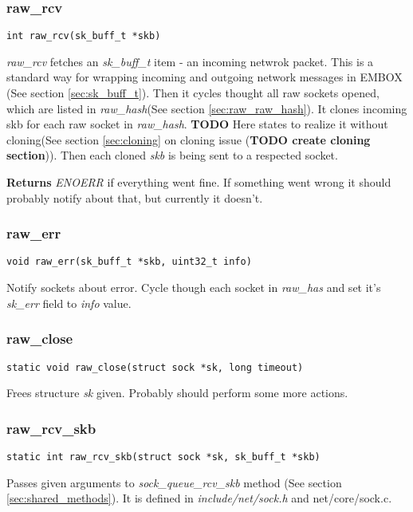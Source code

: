 \documentclass[12pt,a4paper]{article}
\begin{document}
\subsubsection{raw\_rcv}
\label{sec:raw_sock_raw_rcv}
\begin{verbatim}
int raw_rcv(sk_buff_t *skb)
\end{verbatim}

{\it raw\_rcv} fetches an {\it sk\_buff\_t} item - an incoming netwrok packet.
This is a standard way for wrapping incoming and outgoing network messages in
EMBOX (See section \ref{sec:sk_buff_t}). Then it cycles thought all raw sockets
opened, which are listed in {\it raw\_hash}(See section \ref{sec:raw_raw_hash}).
It clones incoming skb for each raw socket in {\it raw\_hash}. {\bf TODO}
Here states to realize it without cloning(See section \ref{sec:cloning} on
cloning issue ({\bf TODO create cloning section})).
Then each cloned {\it skb} is being sent to a respected socket.

{\bf Returns} {\it ENOERR} if everything went fine. If something went wrong it
should probably notify about that, but currently it doesn't.

\subsubsection{raw\_err}
\label{sec:raw_sock_raw_err}
\begin{verbatim}
void raw_err(sk_buff_t *skb, uint32_t info)
\end{verbatim}
Notify sockets about error. Cycle though each socket in {\it raw\_has} and set
it's {\it sk\_err} field to {\it info} value.

\subsubsection{raw\_close}
\label{sec:raw_sock_raw_close}
\label{sec:raw_sock_}
\begin{verbatim}
static void raw_close(struct sock *sk, long timeout)
\end{verbatim}
Frees structure {\it sk} given. Probably should perform some more actions.

\subsubsection{raw\_rcv\_skb}
\label{sec:raw_sock_raw_rcv_skb}
\begin{verbatim}
static int raw_rcv_skb(struct sock *sk, sk_buff_t *skb)
\end{verbatim}
Passes given arguments to {\it sock\_queue\_rcv\_skb} method (See section
{\ref{sec:shared_methods}}). It is defined in {\it include/net/sock.h} and
{net/core/sock.c}.
\end{document}
